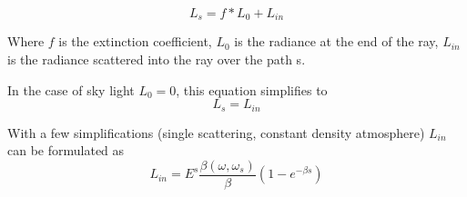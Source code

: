 \documentclass[12pt,a4paper]{scrartcl}
\begin{document}
\begin{equation}
L_s = f * L_0 + L_{in}
\end{equation}

Where $f$ is the extinction coefficient, $L_0$ is the radiance at the end of the ray, $L_{in}$ is the radiance scattered into the ray over the path s.

In the case of sky light $L_0 = 0$, this equation simplifies to 
\begin{equation}
L_s = L_{in}
\end{equation} 

With a few simplifications (single scattering, constant density atmosphere) $L_{in}$ can be formulated as 
\begin{equation}
L_{in} = E^s \frac{\beta(\omega, \omega_s)}{\beta} (1 - e^{-\beta s})
\end{equation}










\end{document}
